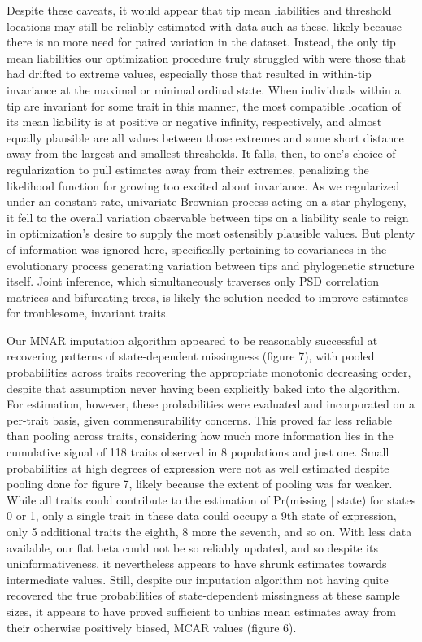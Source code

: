 \documentclass[12pt, twocolumn, twoside]{article}
\begin{document}
Despite these caveats, it would appear that tip mean liabilities and threshold locations may still be reliably estimated with data such as these, likely because there is no more need for paired variation in the dataset. Instead, the only tip mean liabilities our optimization procedure truly struggled with were those that had drifted to extreme values, especially those that resulted in within-tip invariance at the maximal or minimal ordinal state. When individuals within a tip are invariant for some trait in this manner, the most compatible location of its mean liability is at positive or negative infinity, respectively, and almost equally plausible are all values between those extremes and some short distance away from the largest and smallest thresholds. It falls, then, to one's choice of regularization to pull estimates away from their extremes, penalizing the likelihood function for growing too excited about invariance. As we regularized under an constant-rate, univariate Brownian process acting on a star phylogeny, it fell to the overall variation observable between tips on a liability scale to reign in optimization's desire to supply the most ostensibly plausible values. But plenty of information was ignored here, specifically pertaining to covariances in the evolutionary process generating variation between tips and phylogenetic structure itself. Joint inference, which simultaneously traverses only PSD correlation matrices and bifurcating trees, is likely the solution needed to improve estimates for troublesome, invariant traits.

Our MNAR imputation algorithm appeared to be reasonably successful at recovering patterns of state-dependent missingness (figure 7), with pooled probabilities across traits recovering the appropriate monotonic decreasing order, despite that assumption never having been explicitly baked into the algorithm. For estimation, however, these probabilities were evaluated and incorporated on a per-trait basis, given commensurability concerns. This proved far less reliable than pooling across traits, considering how much more information lies in the cumulative signal of 118 traits observed in 8 populations and just one. Small probabilities at high degrees of expression were not as well estimated despite pooling done for figure 7, likely because the extent of pooling was far weaker. While all traits could contribute to the estimation of Pr(missing $\vert$ state) for states 0 or 1, only a single trait in these data could occupy a 9th state of expression, only 5 additional traits the eighth, 8 more the seventh, and so on. With less data available, our flat beta could not be so reliably updated, and so despite its uninformativeness, it nevertheless appears to have shrunk estimates towards intermediate values. Still, despite our imputation algorithm not having quite recovered the true probabilities of state-dependent missingness at these sample sizes, it appears to have proved sufficient to unbias mean estimates away from their otherwise positively biased, MCAR values (figure 6).
\end{document}
